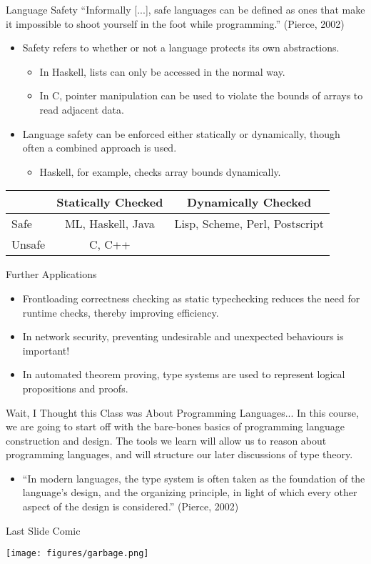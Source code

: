 \documentclass[11pt]{beamer}
\begin{document}
\begin{frame}[fragile=singleslide]{Language Safety}
``Informally [...], safe languages can be defined as ones that make it impossible to shoot yourself in the foot while programming.'' (Pierce, 2002) 
\begin{itemize}
\item Safety refers to whether or not a language protects its own abstractions.  
\begin{itemize}
\item In Haskell, lists can only be accessed in the normal way.
\item In C, pointer manipulation can be used to violate the bounds of arrays to read adjacent data.
\end{itemize}
\item Language safety can be enforced either statically or dynamically, though often a combined approach is used. 
\begin{itemize}
\item Haskell, for example, checks array bounds dynamically.   
\end{itemize}
\end{itemize}
\begin{tabular}{| l || c | c |}
\hline 
& Statically Checked & Dynamically Checked \\ \hline \hline
Safe & ML, Haskell, Java & Lisp, Scheme, Perl, Postscript \\ \hline
Unsafe & C, C++ & \\ \hline 
\end{tabular}
\end{frame}

\begin{frame}[fragile=singleslide]{Further Applications}
\begin{itemize}
\item Frontloading correctness checking as static typechecking reduces the need for runtime checks, thereby improving efficiency.
\item In network security, preventing undesirable and unexpected behaviours is important! 
\item In automated theorem proving, type systems are used to represent logical propositions and proofs.  
\end{itemize}


\end{frame}

\begin{frame}[fragile=singleslide]{Wait, I Thought this Class was About Programming Languages...}
In this course, we are going to start off with the bare-bones basics of programming language construction and design.  The tools we learn will allow us to reason about programming languages, and will structure our later discussions of type theory. 
\begin{itemize}
 \item ``In modern languages, the type system is often taken as the foundation of the language's design, and the organizing principle, in light of which every other aspect of the design is considered.'' (Pierce, 2002) 
 \end{itemize} 
\end{frame}

\begin{frame}[fragile=singleslide]{Last Slide Comic}
\begin{center}
\texttt{[image: figures/garbage.png]}
\end{center}
\end{frame}
\end{document}

